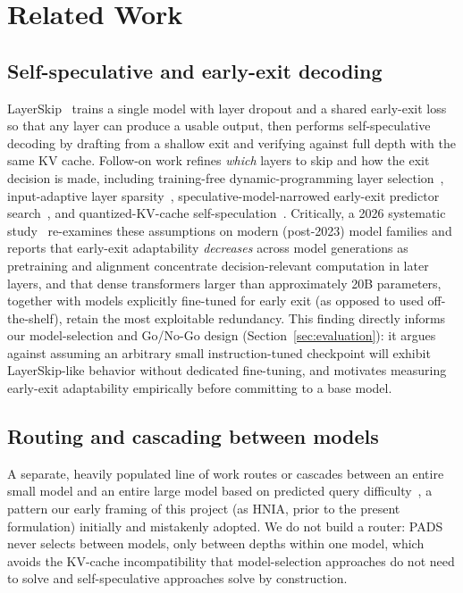 \documentclass[journal]{IEEEtran}
\begin{document}
\section{Related Work}
\label{sec:related}

\subsection{Self-speculative and early-exit decoding}
LayerSkip~\cite{elhoushi2024layerskip} trains a single model with layer dropout and a shared early-exit loss so that any layer can produce a usable output, then performs self-speculative decoding by drafting from a shallow exit and verifying against full depth with the same KV cache. Follow-on work refines \emph{which} layers to skip and how the exit decision is made, including training-free dynamic-programming layer selection~\cite{chen2025clasp}, input-adaptive layer sparsity~\cite{xia2025swift}, speculative-model-narrowed early-exit predictor search~\cite{xu2025specee}, and quantized-KV-cache self-speculation~\cite{quantspec2025}. Critically, a 2026 systematic study~\cite{wei2026diminishing} re-examines these assumptions on modern (post-2023) model families and reports that early-exit adaptability \emph{decreases} across model generations as pretraining and alignment concentrate decision-relevant computation in later layers, and that dense transformers larger than approximately 20B parameters, together with models explicitly fine-tuned for early exit (as opposed to used off-the-shelf), retain the most exploitable redundancy. This finding directly informs our model-selection and Go/No-Go design (Section~\ref{sec:evaluation}): it argues against assuming an arbitrary small instruction-tuned checkpoint will exhibit LayerSkip-like behavior without dedicated fine-tuning, and motivates measuring early-exit adaptability empirically before committing to a base model.

\subsection{Routing and cascading between models}
A separate, heavily populated line of work routes or cascades between an entire small model and an entire large model based on predicted query difficulty~\cite{ong2024routellm,mixllm2025,lookahead2025}, a pattern our early framing of this project (as HNIA, prior to the present formulation) initially and mistakenly adopted. We do not build a router: PADS never selects between models, only between depths within one model, which avoids the KV-cache incompatibility that model-selection approaches do not need to solve and self-speculative approaches solve by construction.
\end{document}
